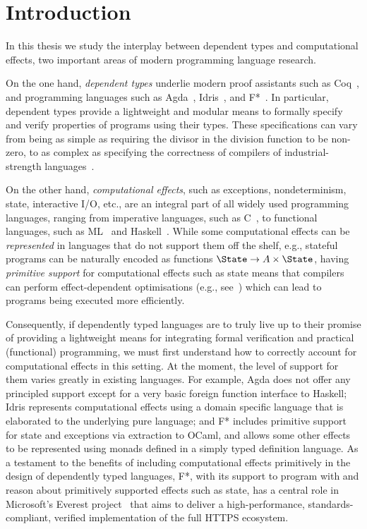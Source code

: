 
\chapter{Introduction}
\label{chap:introduction}

In this thesis we study the interplay between dependent types and computational effects, 
two important areas of modern programming language research. 

On the one hand, \emph{dependent types} underlie modern proof assistants such as Coq~\cite{Coq:Manual}, and  programming languages such as Agda~\cite{Norell:Thesis}, Idris~\cite{Brady:Idris}, and F*~\cite{Swamy:FStar}. In particular, dependent types provide a lightweight and modular means to formally specify and verify properties of programs using their types. These specifications can vary from being as simple as requiring the divisor in the division function to be non-zero, to as complex as specifying the correctness of compilers of industrial-strength languages~\cite{CompCert}.

On the other hand, \emph{computational effects}, such as exceptions, nondeterminism, state, interactive I/O, etc., are an integral part of all widely used programming languages, ranging from imperative languages, such as C~\cite{Kernighan:CLanguage}, to functional languages, such as ML~\cite{ML:Standard} and Haskell~\cite{Marlow:HaskellReport}. While some computational effects can be \emph{represented} in languages that do not support them off the shelf, e.g., stateful programs can be naturally encoded as functions $\State \to A \times \State$, having \emph{primitive support} for computational effects such as state means that compilers can perform effect-dependent optimisations (e.g., see~\cite{Kammar:Thesis}) which can lead to programs being executed more efficiently.

Consequently, if dependently typed languages are to truly live up to their promise of providing a lightweight means for integrating formal verification and practical (functional) programming, we must first understand how to correctly account for computational effects in this setting.
At the moment, the level of support for them varies greatly in existing languages. 
For example, Agda does not offer any principled support except for a very basic foreign function interface to Haskell; Idris represents computational effects using a domain specific language that is elaborated to the underlying pure language; and F* includes primitive support for state and exceptions via extraction to OCaml, and allows some other effects to be represented using monads defined in a simply typed definition language.
%
As a testament to the benefits of including computational effects primitively in the design of dependently typed languages, F*, with its support to program with and reason about primitively supported effects such as state, has a central role in Microsoft's Everest project~\cite{Everest:Project} that aims to deliver a high-performance, standards-compliant, verified implementation of the full HTTPS ecosystem.

